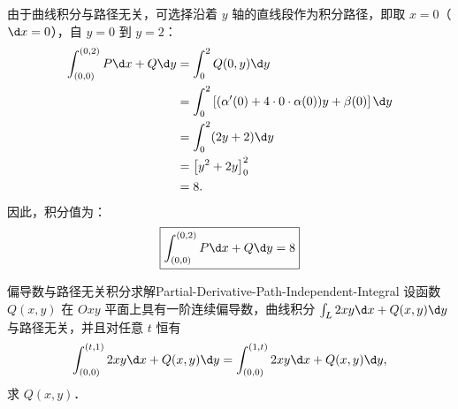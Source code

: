 \begin{solution}

    由于曲线积分与路径无关，可选择沿着 $y$ 轴的直线段作为积分路径，即取 $x = 0$（$\d x = 0$），自 $y = 0$ 到 $y = 2$：
    \begin{equation}
        \begin{aligned}
            \int_{(0,0)}^{(0,2)} P \d x + Q \d y & = \int_0^2 Q(0, y) \d y                                                            \\
                                                 & = \int_0^2 \left[ (\alpha'(0) + 4\cdot 0 \cdot \alpha(0))y + \beta(0) \right] \d y \\
                                                 & = \int_0^2 (2y + 2) \d y                                                           \\
                                                 & = \left[ y^2 + 2y \right]_0^2                                                      \\
                                                 & = 8.
        \end{aligned}
    \end{equation}
    因此，积分值为：
    \begin{equation}
        \boxed{\int_{(0,0)}^{(0,2)} P \d x + Q \d y = 8}
    \end{equation}
\end{solution}

\begin{problem}{偏导数与路径无关积分求解}{Partial-Derivative-Path-Independent-Integral}
    设函数 $Q(x, y)$ 在 $Oxy$ 平面上具有一阶连续偏导数，曲线积分 $\int_L 2xy \d x+Q(x, y) \d y$ 与路径无关，并且对任意 $t$ 恒有
    \begin{equation}
        \int_{(0,0)}^{(t,1)} 2xy \d x + Q(x, y) \d y = \int_{(0,0)}^{(1,t)} 2xy \d x + Q(x, y) \d y,
    \end{equation}
    求 $Q(x, y)$．
\end{problem}

